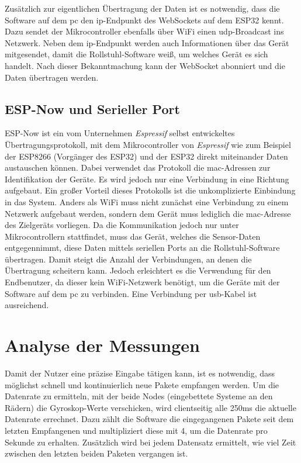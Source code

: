 Zusätzlich zur eigentlichen Übertragung der Daten ist es notwendig, dass die Software auf dem \ac{pc} den \ac{ip}-Endpunkt des WebSockets auf dem ESP32 kennt.
Dazu sendet der Mikrocontroller ebenfalls über WiFi einen \ac{udp}-Broadcast ins Netzwerk.
Neben dem \ac{ip}-Endpunkt werden auch Informationen über das Gerät mitgesendet, damit die Rollstuhl-Software weiß, um welches Gerät es sich handelt.
Nach dieser Bekanntmachung kann der WebSocket abonniert und die Daten übertragen werden.

\subsection{ESP-Now und Serieller Port}
ESP-Now ist ein vom Unternehmen \textit{Espressif} selbst entwickeltes Übertragungsprotokoll, mit dem Mikrocontroller von \textit{Espressif} wie zum Beispiel der ESP8266 (Vorgänger des ESP32) und der ESP32 direkt miteinander Daten austauschen können.
Dabei verwendet das Protokoll die \ac{mac}-Adressen zur Identifikation der Geräte.
Es wird jedoch nur eine Verbindung in eine Richtung aufgebaut.
Ein großer Vorteil dieses Protokolls ist die unkomplizierte Einbindung in das System.
Anders als WiFi muss nicht zunächst eine Verbindung zu einem Netzwerk aufgebaut werden, sondern dem Gerät muss lediglich die \ac{mac}-Adresse des Zielgeräts vorliegen.
Da die Kommunikation jedoch nur unter Mikrocontrollern stattfindet, muss das Gerät, welches die Sensor-Daten entgegennimmt, diese Daten mittels seriellen Ports an die Rollstuhl-Software übertragen.
Damit steigt die Anzahl der Verbindungen, an denen die Übertragung scheitern kann.
Jedoch erleichtert es die Verwendung für den Endbenutzer, da dieser kein WiFi-Netzwerk benötigt, um die Geräte mit der Software auf dem \ac{pc} zu verbinden.
Eine Verbindung per \ac{usb}-Kabel ist ausreichend.

\section{Analyse der Messungen}
Damit der Nutzer eine präzise Eingabe tätigen kann, ist es notwendig, dass möglichst schnell und kontinuierlich neue Pakete empfangen werden.
Um die Datenrate zu ermitteln, mit der beide Nodes (eingebettete Systeme an den Rädern) die Gyroskop-Werte verschicken, wird clientseitig alle 250ms die aktuelle Datenrate errechnet.
Dazu zählt die Software die eingegangenen Pakete seit dem letzten Empfangenen und multipliziert diese mit 4, um die Datenrate pro Sekunde zu erhalten.
Zusätzlich wird bei jedem Datensatz ermittelt, wie viel Zeit zwischen den letzten beiden Paketen vergangen ist.

